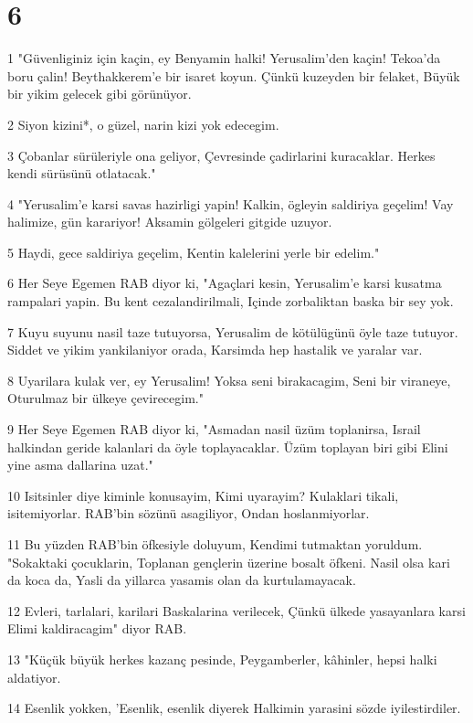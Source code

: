 \chapter{6}

\par 1 "Güvenliginiz için kaçin, ey Benyamin halki! Yerusalim'den kaçin! Tekoa'da boru çalin! Beythakkerem'e bir isaret koyun. Çünkü kuzeyden bir felaket, Büyük bir yikim gelecek gibi görünüyor.
\par 2 Siyon kizini*, o güzel, narin kizi yok edecegim.
\par 3 Çobanlar sürüleriyle ona geliyor, Çevresinde çadirlarini kuracaklar. Herkes kendi sürüsünü otlatacak."
\par 4 "Yerusalim'e karsi savas hazirligi yapin! Kalkin, ögleyin saldiriya geçelim! Vay halimize, gün karariyor! Aksamin gölgeleri gitgide uzuyor.
\par 5 Haydi, gece saldiriya geçelim, Kentin kalelerini yerle bir edelim."
\par 6 Her Seye Egemen RAB diyor ki, "Agaçlari kesin, Yerusalim'e karsi kusatma rampalari yapin. Bu kent cezalandirilmali, Içinde zorbaliktan baska bir sey yok.
\par 7 Kuyu suyunu nasil taze tutuyorsa, Yerusalim de kötülügünü öyle taze tutuyor. Siddet ve yikim yankilaniyor orada, Karsimda hep hastalik ve yaralar var.
\par 8 Uyarilara kulak ver, ey Yerusalim! Yoksa seni birakacagim, Seni bir viraneye, Oturulmaz bir ülkeye çevirecegim."
\par 9 Her Seye Egemen RAB diyor ki, "Asmadan nasil üzüm toplanirsa, Israil halkindan geride kalanlari da öyle toplayacaklar. Üzüm toplayan biri gibi Elini yine asma dallarina uzat."
\par 10 Isitsinler diye kiminle konusayim, Kimi uyarayim? Kulaklari tikali, isitemiyorlar. RAB'bin sözünü asagiliyor, Ondan hoslanmiyorlar.
\par 11 Bu yüzden RAB'bin öfkesiyle doluyum, Kendimi tutmaktan yoruldum. "Sokaktaki çocuklarin, Toplanan gençlerin üzerine bosalt öfkeni. Nasil olsa kari da koca da, Yasli da yillarca yasamis olan da kurtulamayacak.
\par 12 Evleri, tarlalari, karilari Baskalarina verilecek, Çünkü ülkede yasayanlara karsi Elimi kaldiracagim" diyor RAB.
\par 13 "Küçük büyük herkes kazanç pesinde, Peygamberler, kâhinler, hepsi halki aldatiyor.
\par 14 Esenlik yokken, 'Esenlik, esenlik diyerek Halkimin yarasini sözde iyilestirdiler.
